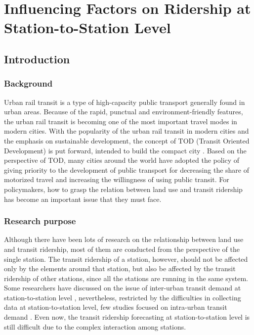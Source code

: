 \chapter{Influencing Factors on Ridership at Station-to-Station Level}

\section{Introduction}
\subsection{Background}
%
Urban rail transit is a type of high-capacity public transport generally found in urban areas. Because of the rapid, punctual and environment-friendly features, the urban rail transit is becoming one of the most important travel modes in modern cities. With the popularity of the urban rail transit in modern cities and the emphasis on sustainable development, the concept of TOD (Transit Oriented Development) is put forward, intended to build the compact city \cite{calthorpe1993next}. Based on the perspective of TOD, many cities around the world have adopted the policy of giving priority to the development of public transport for decreasing the share of motorized travel and increasing the willingness of using public transit. For policymakers, how to grasp the relation between land use and transit ridership has become an important issue that they must face.

\subsection{Research purpose}
%
Although there have been lots of research on the relationship between land use and transit ridership, most of them are conducted from the perspective of the single station. The transit ridership of a station, however, should not be affected only by the elements around that station, but also be affected by the transit ridership of other stations, since all the stations are running in the same system. Some researchers have discussed on the issue of inter-urban transit demand at station-to-station level \cite{wardman1997inter,jones1983demand}, nevertheless, restricted by the difficulties in collecting data at station-to-station level, few studies focused on intra-urban transit demand \cite{choi2012analysis}. Even now, the transit ridership forecasting at station-to-station level is still difficult due to the complex interaction among stations. 

